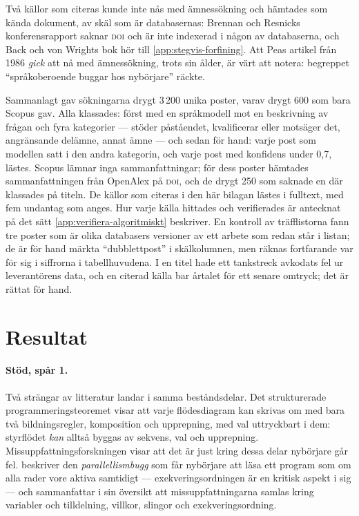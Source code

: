 Två källor som citeras kunde inte nås med ämnessökning och hämtades som
kända dokument, av skäl som är databasernas: Brennan och Resnicks
konferensrapport\autocite{brennan2012} saknar \textsc{doi} och är inte
indexerad i någon av databaserna, och Back och von Wrights
bok\autocite{back1998refinement} hör till \cref{app:stegvis-forfining}.
Att Peas artikel från 1986\autocite{pea1986} \emph{gick} att nå med
ämnessökning, trots sin ålder, är värt att notera: begreppet
\enquote{språkoberoende buggar hos nybörjare} räckte.

Sammanlagt gav sökningarna drygt 3\,200 unika poster, varav drygt 600
som bara Scopus gav.  Alla klassades:
först med en språkmodell mot en beskrivning av frågan och fyra kategorier
--- stöder påståendet, kvalificerar eller motsäger det, angränsande
delämne, annat ämne --- och sedan för hand: varje post som modellen satt i
den andra kategorin, och varje post med konfidens under 0,7, lästes.
Scopus lämnar inga sammanfattningar; för dess poster hämtades
sammanfattningen från OpenAlex på \textsc{doi}, och de drygt 250 som
saknade en där klassades på titeln.  De
källor som citeras i den här bilagan lästes i fulltext, med fem undantag
som anges.  Hur varje källa hittades och verifierades är antecknat på
det sätt \cref{app:verifiera-algoritmiskt} beskriver.  En kontroll av
träfflistorna fann tre poster som är olika databasers versioner av ett
arbete som redan står i listan; de är för hand märkta
\enquote{dubblettpost} i skälkolumnen, men räknas fortfarande var för
sig i siffrorna i tabellhuvudena.  I en titel hade ett tankstreck
avkodats fel ur leverantörens data, och en citerad källa bar årtalet för
ett senare omtryck; det är rättat för hand.

\section{Resultat}
\label{sec:sok-resultat}

\paragraph{Stöd, spår 1.}  Två strängar av litteratur landar i samma
beståndsdelar.  Det strukturerade programmeringsteoremet visar att varje
flödesdiagram kan skrivas om med bara två bildningsregler, komposition
och upprepning, med val uttryckbart i dem\autocite{bohm1966}: styrflödet
\emph{kan} alltså byggas av sekvens, val och upprepning.
Missuppfattningsforskningen visar att det är just kring dessa delar
nybörjare går fel.  \textcite{pea1986} beskriver den
\emph{parallellismbugg} som får nybörjare att läsa ett program som om
alla rader vore aktiva samtidigt --- exekveringsordningen är en kritisk
aspekt i sig --- och \textcite{qian2017} sammanfattar i sin översikt att
missuppfattningarna samlas kring variabler och tilldelning, villkor,
slingor och exekveringsordning.

